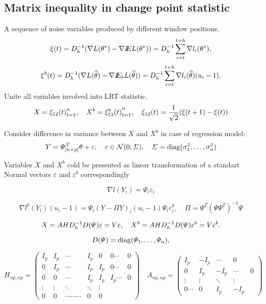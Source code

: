 

\subsection{Matrix inequality in change point statistic}
A sequence of noise variables produced by different window positions.    
\[
\xi(t) = D_h^{-1} (\nabla L(\theta^*) - \nabla I\!\!E L(\theta^*))  = D_h^{-1} \sum_{i = t}^{t+h} \nabla l_i(\theta^*),
\]
\[
\xi^b(t) = D_h^{-1} (\nabla L(\widehat{\theta}) - \nabla I\!\!E_b L(\widehat{\theta})) = D_h^{-1} \sum_{i = t}^{t+h} \nabla l_i(\widehat{\theta})(u_i - 1).
\]
Unite all variables involved into LRT statistic.  
\[
X = {\xi_{12}(t)}_{t=1}^n, \quad X^b = {\xi_{12}^b(t)}_{t=1}^n,
\quad 
\xi_{12}(t) = \frac{1}{\sqrt{2}} (\xi(t+1) - \xi(t))
\]

Consider difference in variance between $X$ and $X^b$ in case of regression model:
\[
Y = \varPsi^T_{[n \times p]} \theta + \varepsilon,
\quad
\varepsilon \in \mathcal{N}(0, \varSigma), 
\quad \varSigma = \operatorname{diag}(\sigma_1^2,\ldots,\sigma_n^2)
\]

Variables $X$ and $X^b$ cold be presented as linear transformation of a standart Normal vectors $\varepsilon$ and $\varepsilon^b$ correspondingly  

\[
\nabla l(Y_i) = \Psi_i \varepsilon_i
\]

\[
\nabla l^b(Y_i) (u_i - 1) = \Psi_i (Y - \Pi Y)_i (u_i - 1) \Psi_i \varepsilon_i^b,
\quad
\Pi =  \Psi^T (\Psi\Psi^T)^{-1} \Psi
\]

\[
X =  A H D_h^{-1}  D(\varPsi) \varepsilon = V \varepsilon, 
\quad X^b = A H D_h^{-1}  D(\varPsi) \varepsilon^b  = V \varepsilon^b.
\]

\[
D(\varPsi) = \operatorname{diag}(\varPsi_1,\ldots,\varPsi_n),
\]

\[
H_{np,np} =
 \begin{pmatrix}
  I_p & I_p & \cdots & I_p & 0 & 0 \cdots & 0  \\
  0 & I_p & \cdots & I_p & I_p & 0 \cdots & 0 \\
  0 & 0 & \cdots & I_p & I_p & I_p  \cdots & 0 \\
  \vdots  & \vdots  & \ddots  & \ddots & \vdots  \\
  0 & 0 & \cdots \cdots  \cdots & 0 & 0
 \end{pmatrix}
 \quad
A_{np, np} =
 \begin{pmatrix}
  I_p & -I_p & \cdots & 0  \\
  0 & I_p  & -I_p & \cdots & 0 \\
  \vdots  & \vdots  & \ddots & \vdots  \\
  0  \cdots & 0 & I_p & -I_p
 \end{pmatrix}
\]

